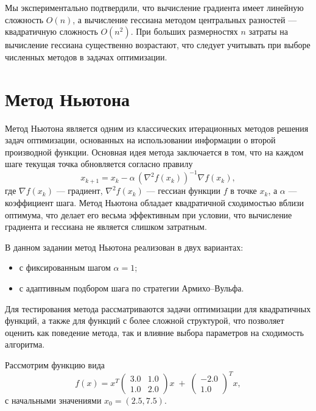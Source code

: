 \documentclass[a4paper,12pt]{article}
\begin{document}
\noindent Мы экспериментально подтвердили, что вычисление градиента имеет линейную сложность \(O(n)\), а вычисление гессиана методом центральных разностей --- квадратичную сложность \(O(n^2)\). При больших размерностях \(n\) затраты на вычисление гессиана существенно возрастают, что следует учитывать при выборе численных методов в задачах оптимизации.

\section{Метод Ньютона}
Метод Ньютона является одним из классических итерационных методов решения задач оптимизации, основанных на использовании информации о второй производной функции. Основная идея метода заключается в том, что на каждом шаге текущая точка обновляется согласно правилу
\[
x_{k+1} = x_k - \alpha \, \left(\nabla^2 f(x_k)\right)^{-1} \nabla f(x_k),
\]
где \(\nabla f(x_k)\) — градиент, \(\nabla^2 f(x_k)\) — гессиан функции \(f\) в точке \(x_k\), а \(\alpha\) — коэффициент шага. Метод Ньютона обладает квадратичной сходимостью вблизи оптимума, что делает его весьма эффективным при условии, что вычисление градиента и гессиана не является слишком затратным.

В данном задании метод Ньютона реализован в двух вариантах:
\begin{itemize}
    \item с фиксированным шагом \(\alpha = 1\);
    \item с адаптивным подбором шага по стратегии Армихо--Вульфа.
\end{itemize}
Для тестирования метода рассматриваются задачи оптимизации для квадратичных функций, а также для функций с более сложной структурой, что позволяет оценить как поведение метода, так и влияние выбора параметров на сходимость алгоритма.

Рассмотрим функцию вида
\[
f(x) = x^T \begin{pmatrix} 3.0 & 1.0 \\[6pt] 1.0 & 2.0 \end{pmatrix} x \;+\; 
\begin{pmatrix}-2.0 \\[2pt] 1.0\end{pmatrix}^T x,
\]
с начальными значениями \(x_0 = (2.5, 7.5)\). 
\end{document}
